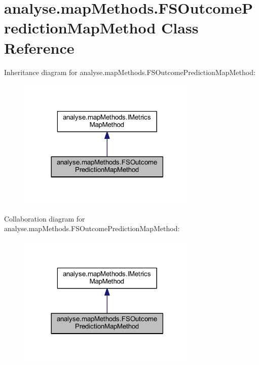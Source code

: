 \hypertarget{classanalyse_1_1map_methods_1_1_f_s_outcome_prediction_map_method}{}\section{analyse.\+map\+Methods.\+F\+S\+Outcome\+Prediction\+Map\+Method Class Reference}
\label{classanalyse_1_1map_methods_1_1_f_s_outcome_prediction_map_method}


Inheritance diagram for analyse.\+map\+Methods.\+F\+S\+Outcome\+Prediction\+Map\+Method\+:
\nopagebreak
\begin{figure}[H]
\begin{center}
\leavevmode
\includegraphics[width=245pt]{classanalyse_1_1map_methods_1_1_f_s_outcome_prediction_map_method__inherit__graph}
\end{center}
\end{figure}


Collaboration diagram for analyse.\+map\+Methods.\+F\+S\+Outcome\+Prediction\+Map\+Method\+:
\nopagebreak
\begin{figure}[H]
\begin{center}
\leavevmode
\includegraphics[width=245pt]{classanalyse_1_1map_methods_1_1_f_s_outcome_prediction_map_method__coll__graph}
\end{center}
\end{figure}
